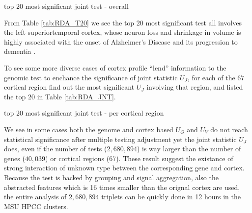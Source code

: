 \begin{table}[!htbp]
\centering

\caption{top 20 most significant joint test - overall}
\label{tab:RDA_T20}
\end{table}
From Table \ref{tab:RDA_T20} we see the top 20 most significant test all involves the left superiortemporal cortex, whose neuron loss and shrinkage in volume is highly associated with the onset of Alzheimer's Disease and its progression to dementia \cite{AD:ST1}. 

To see some more diverse cases of cortex profile ``lend'' information to the genomic test to enchance the significance of joint statistic $U_J$, for each of the 67 cortical region find out the most significant $U_J$ involving that region, and listed the top 20 in Table \ref{tab:RDA_JNT}.
\begin{table}[!htbp]
\centering

\caption{top 20 most significant joint test - per cortical region}
\label{tab:RDA_JNT}
\end{table}
We see in some cases both the genome and cortex based $U_G$ and $U_V$ do not reach statistical significance after multiple testing adjustment yet the joint statistic $U_J$ does, even if the number of tests ($2,680,894$) is way larger than the number of genes ($40,039$) or cortical regions ($67$). These result suggest the existance of strong interaction of unknown type between the corresponding gene and cortex. Because the test is backed by grouping and signal aggregation, also the abstracted features which is 16 times smaller than the orignal cortex are used, the entire analysis of $2,680,894$ triplets can be quickly done in 12 hours in the MSU HPCC clusters.